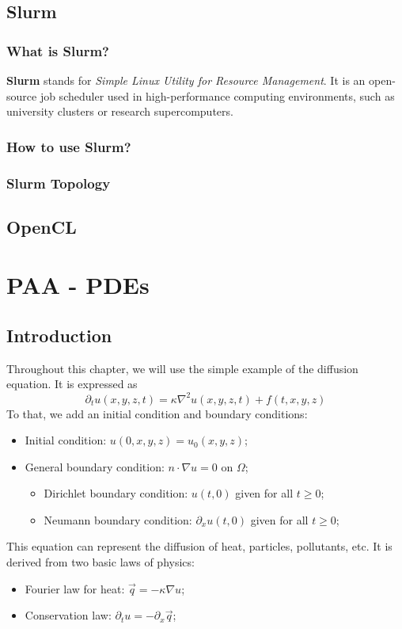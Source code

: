 \documentclass[12pt, openany]{report}
\theoremstyle{definition}
\begin{document}
\section{Slurm}
\subsection{What is Slurm?}
\textbf{Slurm} stands for \textit{Simple Linux Utility for Resource Management}. It is an open-source job scheduler used in high-performance computing environments, such as university clusters or research supercomputers.
\subsection{How to use Slurm?}
\subsection{Slurm Topology}
\section{OpenCL}
\chapter{PAA - PDEs}
\section{Introduction}
Throughout this chapter, we will use the simple example of the diffusion equation. It is expressed as 
\begin{equation}
	\partial_t u(x,y,z,t) = \kappa \nabla^2 u(x,y,z,t) + f(t,x,y,z)
\end{equation}
To that, we add an initial condition and boundary conditions:
\begin{itemize}
	\item Initial condition: $u(0,x,y,z) = u_0(x,y,z)$;
	\item General boundary condition: $ n\cdot \nabla u=0$ on $\Omega$;
	\begin{itemize}
		\item Dirichlet boundary condition: $u(t,0)$ given for all $t\ge0$;
		\item Neumann boundary condition: $\partial_xu(t,0)$ given for all $t\ge0$;
	\end{itemize}
\end{itemize}
This equation can represent the diffusion of heat, particles, pollutants, etc. It is derived from two basic laws of physics:
\begin{itemize}
	\item Fourier law for heat: $\vec q=-\kappa \nabla u$;
	\item Conservation law: $\partial_t u = -\partial_x \vec q$;
\end{itemize}
\end{document}
